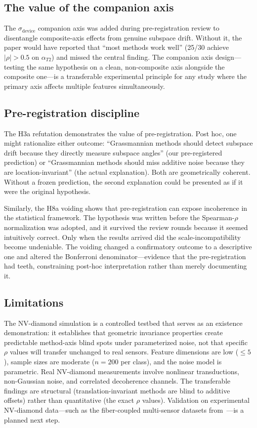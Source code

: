 \documentclass[11pt]{article}
\begin{document}
\subsection{The value of the companion axis}

The $\sigma_\text{device}$ companion axis was added during
pre-registration review to disentangle composite-axis effects from
genuine subspace drift.  Without it, the paper would have reported that
``most methods work well'' (25/30 achieve $|\rho| > 0.5$ on
$\alpha_{T2}$) and missed the central finding.  The companion axis design---testing the same
hypothesis on a clean, non-composite axis alongside the composite
one---is a transferable experimental principle for any study where the
primary axis affects multiple features simultaneously.

\subsection{Pre-registration discipline}

The H3a refutation demonstrates the value of pre-registration.  Post
hoc, one might rationalize either outcome: ``Grassmannian methods should
detect subspace drift because they directly measure subspace angles''
(our pre-registered prediction) or ``Grassmannian methods should miss
additive noise because they are location-invariant'' (the actual
explanation).  Both are geometrically coherent.  Without a frozen
prediction, the second explanation could be presented as if it were
the original hypothesis.

Similarly, the H8a voiding shows that pre-registration can expose
incoherence in the statistical framework.  The hypothesis was written
before the Spearman-$\rho$ normalization was adopted, and it survived
the review rounds because it seemed intuitively correct.  Only when the
results arrived did the scale-incompatibility become undeniable.  The
voiding changed a confirmatory outcome to a descriptive one and altered
the Bonferroni denominator---evidence that the pre-registration had
teeth, constraining post-hoc interpretation rather than merely
documenting it.

\subsection{Limitations}

The NV-diamond simulation is a controlled testbed that serves as an
existence demonstration: it establishes that geometric invariance
properties create predictable method-axis blind spots under
parameterized noise, not that specific $\rho$ values will transfer
unchanged to real sensors.  Feature dimensions are low ($\leq 5$),
sample sizes are moderate ($n = 200$ per class), and the noise model
is parametric.  Real NV-diamond measurements involve nonlinear
transductions, non-Gaussian noise, and correlated decoherence channels.
The transferable findings are structural (translation-invariant methods
are blind to additive offsets) rather than quantitative (the exact
$\rho$ values).  Validation on experimental NV-diamond data---such as the fiber-coupled
multi-sensor datasets from~\citet{rajpal2025evaluating}---is a planned
next step.
\end{document}
